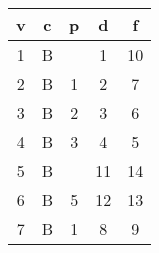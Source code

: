 \begin{tabular}{c | c | c | c | c }
	v & c & p & d & f \\ \hline
	1 & B &   & 1  & 10 \\
	2 & B & 1 & 2  & 7 \\
	3 & B & 2 & 3  & 6 \\
	4 & B & 3 & 4  & 5 \\
	5 & B &   & 11 & 14 \\
	6 & B & 5 & 12 & 13 \\
	7 & B & 1 & 8  & 9 \\
\end{tabular}


